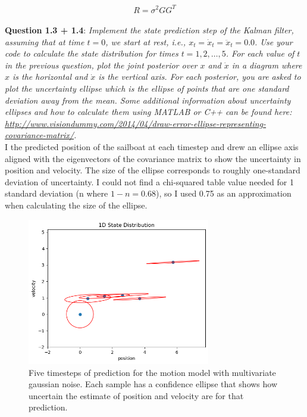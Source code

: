 \documentclass{article}
\begin{document}
\begin{equation}\label{R_calc}
    R = \sigma^2 G G^T
\end{equation}
\\
{\bf Question 1.3 + 1.4}: \textit{Implement the state prediction step of the Kalman filter, assuming that at time $t = 0$, we start at rest, i.e., $x_t = \dot{x}_t = \ddot{x}_t = 0.0$. Use your code to calculate the state distribution for times $t = 1, 2, \ldots, 5$.
For each value of $t$ in the previous question, plot the joint posterior over $x$ and $\dot{x}$ in a diagram where $x$ is the horizontal and $\dot{x}$ is the vertical axis. For each posterior, you are asked to plot the uncertainty ellipse which is the ellipse of points that are one standard deviation away from the mean. Some additional information about uncertainty ellipses and how to calculate them using MATLAB or C++ can be found here: \url{http://www.visiondummy.com/2014/04/draw-error-ellipse-representing-covariance-matrix/}.} \\

I the predicted position of the sailboat at each timestep and drew an ellipse axis aligned with the eigenvectors of the covariance matrix to show the uncertainty in position and velocity. The size of the ellipse corresponds to roughly one-standard deviation of uncertainty. I could not find a chi-squared table value needed for 1 standard deviation (n where $1-n = 0.68$), so I used 0.75 as an approximation when calculating the size of the ellipse.

\begin{figure}[h]
    \includegraphics[width=8cm]{conf_ellipses.png}
    \centering
    \caption{Five timesteps of prediction for the motion model with multivariate gaussian noise. Each sample has a confidence ellipse that shows how uncertain the estimate of position and velocity are for that prediction.}
\end{figure}
\end{document}
